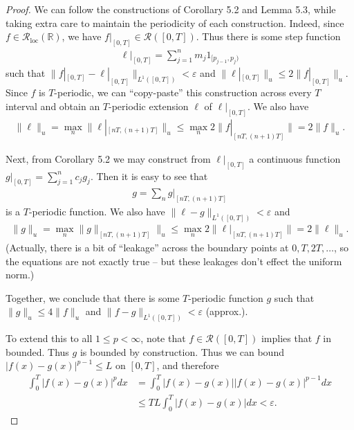 \documentclass[12pt]{article}
\theoremstyle{remark}
\theoremstyle{named}
\newcommand{\e}{\varepsilon}
\newcommand{\R}{\mathbb R}
\newcommand{\abs}[1]{|#1|}
\newcommand{\Rloc}{\mathcal R_{\text{loc}}}
\begin{document}
\begin{proof}
    We can follow the constructions of Corollary 5.2 and Lemma 5.3, while taking extra care to maintain the periodicity of each construction. Indeed, since \(f \in \Rloc(\R)\), we have \(f|_{[0, T]} \in \mathcal R([0, T])\). Thus there is some step function
    \begin{align*}
        \ell|_{[0, T]} = \sum_{j = 1}^n m_j 1_{[p_{j - 1}, p_j)}
    \end{align*}
    such that \(\|f|_{[0, T]} - \ell|_{[0, T]}\|_{L^1([0, T])} < \e\) and \(\|\ell|_{[0, T]}\|_u \leq 2 \|f|_{[0, T]}\|_u\). Since \(f\) is \(T\)-periodic, we can ``copy-paste'' this construction across every \(T\) interval and obtain an \(T\)-periodic extension \(\ell\) of \(\ell|_{[0, T]}\). We also have 
    \begin{align*}
        \|\ell\|_u = \max_n \|\ell|_{[nT, (n + 1)T]}\|_u \leq \max_n 2\|f|_{[nT, (n+1)T]}\| = 2\|f\|_u.
    \end{align*}

    Next, from Corollary 5.2 we may construct from \(\ell|_{[0, T]}\) a continuous function \(g|_{[0, T]} = \sum_{j = 1}^{n}c_j g_j\). Then it is easy to see that 
    \begin{align*}
        g = \sum_{n}^{} g|_{[nT, (n + 1)T]}
    \end{align*}
    is a \(T\)-periodic function. We also have \(\|\ell - g\|_{L^1([0, T])} < \e\) and 
    \begin{align*}
        \|g\|_u = \max_n \|g\|_{[nT, (n + 1)T]}\|_u \leq \max_n 2\|\ell|_{[nT, (n+1)T]}\| = 2\|\ell\|_u.
    \end{align*}
    (Actually, there is a bit of ``leakage'' across the boundary points at \(0, T, 2T, \ldots\), so the equations are not exactly true -- but these leakages don't effect the uniform norm.)

    Together, we conclude that there is some \(T\)-periodic function \(g\) such that \(\|g\|_u \leq 4 \|f\|_u\) and \(\|f - g\|_{L^1([0, T])} < \e\) (approx.).

    To extend this to all \(1 \leq p < \infty\), note that \(f \in \mathcal R([0, T])\) implies that \(f\) in bounded. Thus \(g\) is bounded by construction. Thus we can bound \(|f(x) - g(x)|^{p - 1} \leq L\) on \([0, T]\), and therefore
    \begin{align*}
        \int_{0}^{T} \abs{f(x) - g(x)}^p dx &= \int_{0}^{T} \abs{f(x) - g(x)}\abs{f(x) - g(x)}^{p - 1} dx \\
        &\leq TL \int_{0}^{T} \abs{f(x) - g(x)}dx < \e.
    \end{align*} 
\end{proof}
\end{document}

